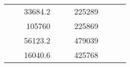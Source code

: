 \begin{table}[H]
\begin{tabular}{|ccrccrccc}
\multicolumn{1}{|c|}{\cellcolor[HTML]{FFFFC7}}                                & \multicolumn{1}{c|}{\cellcolor[HTML]{DAE8FC}}                      & \multicolumn{1}{r|}{\cellcolor[HTML]{DAE8FC}33684.2}   & \multicolumn{1}{c|}{\cellcolor[HTML]{FFFFC7}}                                & \multicolumn{1}{c|}{\cellcolor[HTML]{DAE8FC}}                       & \multicolumn{1}{r|}{\cellcolor[HTML]{DDFDFF}225289}    &                                                                              &                                                                    &                                                        \\ \cline{3-3} \cline{6-6}
\multicolumn{1}{|c|}{\cellcolor[HTML]{FFFFC7}}                                & \multicolumn{1}{c|}{\cellcolor[HTML]{DAE8FC}}                      & \multicolumn{1}{r|}{\cellcolor[HTML]{DDFDFF}105760}    & \multicolumn{1}{c|}{\cellcolor[HTML]{FFFFC7}}                                & \multicolumn{1}{c|}{\cellcolor[HTML]{DAE8FC}}                       & \multicolumn{1}{r|}{\cellcolor[HTML]{DAE8FC}225869}    &                                                                              &                                                                    &                                                        \\ \cline{3-3} \cline{6-6}
\multicolumn{1}{|c|}{\cellcolor[HTML]{FFFFC7}}                                & \multicolumn{1}{c|}{\cellcolor[HTML]{DAE8FC}}                      & \multicolumn{1}{r|}{\cellcolor[HTML]{DAE8FC}56123.2}   & \multicolumn{1}{c|}{\cellcolor[HTML]{FFFFC7}}                                & \multicolumn{1}{c|}{\cellcolor[HTML]{DAE8FC}}                       & \multicolumn{1}{r|}{\cellcolor[HTML]{DDFDFF}479039}    &                                                                              &                                                                    &                                                        \\ \cline{3-3} \cline{6-6}
\multicolumn{1}{|c|}{\cellcolor[HTML]{FFFFC7}}                                & \multicolumn{1}{c|}{\cellcolor[HTML]{DAE8FC}}                      & \multicolumn{1}{r|}{\cellcolor[HTML]{DDFDFF}16040.6}   & \multicolumn{1}{c|}{\cellcolor[HTML]{FFFFC7}}                                & \multicolumn{1}{c|}{\cellcolor[HTML]{DAE8FC}}                       & \multicolumn{1}{r|}{\cellcolor[HTML]{DAE8FC}425768}    &                                                                              &                                                                    &                                                        \\ \cline{3-3} \cline{6-6}

\end{tabular}
\end{table}
